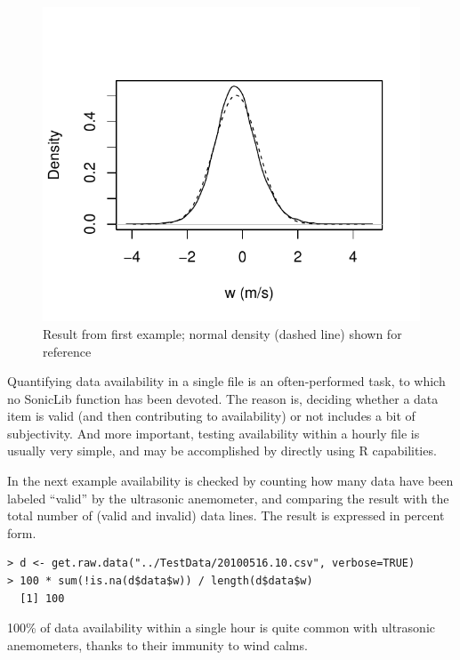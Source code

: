 \documentclass[a4paper,10pt]{book}
\begin{document}
\begin{figure}[htp]
 \centering
 \begin{center}
 \includegraphics[scale=1.1,keepaspectratio=true]{./diagrams/get_raw_data_1.pdf}
 \end{center}
 \caption{Result from first example; normal density (dashed line) shown for reference}
 \label{fig:get.raw.data.1}
\end{figure}

Quantifying data availability in a single file is an often-performed task, to which no SonicLib function has been devoted. The reason is, deciding whether a data item is valid (and then contributing to availability) or not includes a bit of subjectivity. And more important, testing availability within a hourly file is usually very simple, and may be accomplished by directly using R capabilities.

In the next example availability is checked by counting how many data have been labeled ``valid'' by the ultrasonic anemometer, and comparing the result with the total number of (valid and invalid) data lines. The result is expressed in percent form.

\begin{verbatim}
> d <- get.raw.data("../TestData/20100516.10.csv", verbose=TRUE)
> 100 * sum(!is.na(d$data$w)) / length(d$data$w)
  [1] 100
\end{verbatim} 

100\% of data availability within a single hour is quite common with ultrasonic anemometers, thanks to their immunity to  wind calms.
\end{document}
